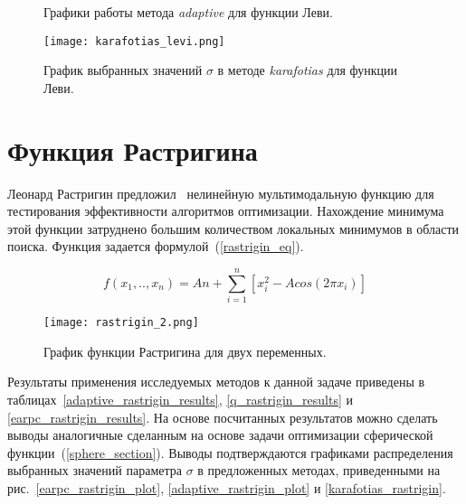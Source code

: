\begin{figure}
  \centering
  \caption{ Графики работы метода \textit{adaptive} для функции Леви.}
  \label{adaptive_levi_plot}
\end{figure}

\begin{figure}
  \centering
  \texttt{[image: karafotias\_levi.png]}
  \caption{График выбранных значений $\sigma$ в методе \textit{karafotias} для функции Леви.}
  \label{karafotias_levi}
\end{figure}

\section{Функция Растригина}

Леонард Растригин предложил~\cite{rastrigin} нелинейную мультимодальную функцию для тестирования эффективности алгоритмов оптимизации. Нахождение минимума этой функции затруднено большим количеством локальных минимумов в области поиска. Функция задается формулой~(\ref{rastrigin_eq}).

\begin{equation}
\label{rastrigin_eq}
f(x_1, .., x_n) = An + \sum\limits_{i = 1}^n\left[ x_i^2 - Acos\left(2 \pi x_i \right)\right]
\end{equation}

\begin{figure}
    \centering
    \texttt{[image: rastrigin\_2.png]}
    \caption{График функции Растригина для двух переменных.}
    \label{rastrigin_plot}
\end{figure}

Результаты применения исследуемых методов к данной задаче приведены в таблицах~\ref{adaptive_rastrigin_results}, \ref{q_rastrigin_results} и \ref{earpc_rastrigin_results}. На основе посчитанных результатов можно сделать выводы аналогичные сделанным на основе задачи оптимизации сферической функции~(\protect\ref{sphere_section}). Выводы подтверждаются графиками распределения выбранных значений параметра $\sigma$ в предложенных методах, приведенными на рис.~\ref{earpc_rastrigin_plot}, \ref{adaptive_rastrigin_plot} и \ref{karafotias_rastrigin}.

